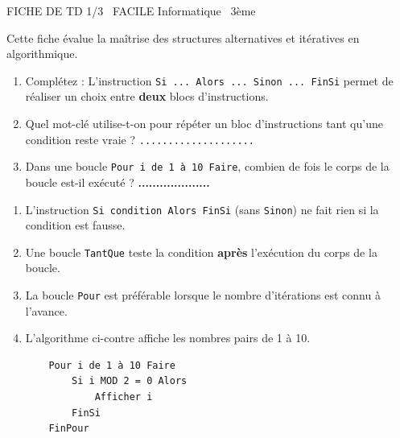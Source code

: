 \documentclass[11pt]{article}
\begin{document}
\begin{tcolorbox}[enhanced,colback=popink,colframe=popink,arc=10pt,boxrule=0pt,left=12pt,right=12pt,top=9pt,bottom=9pt]
{\color{white}\popxbold\small FICHE DE TD 1/3 \textbullet\ FACILE \hfill Informatique \textbullet\ 3ème\par}
\end{tcolorbox}
\vspace{4pt}
Cette fiche évalue la maîtrise des structures alternatives et itératives en algorithmique.

\begin{exercice}
\begin{enumerate}
    \item Complétez : L'instruction \texttt{Si ... Alors ... Sinon ... FinSi} permet de réaliser un choix entre \textbf{deux} blocs d'instructions.
    \item Quel mot-clé utilise-t-on pour répéter un bloc d'instructions tant qu'une condition reste vraie ? \hfill \texttt{....................}
    \item Dans une boucle \texttt{Pour i de 1 à 10 Faire}, combien de fois le corps de la boucle est-il exécuté ? \hfill \textbf{....................}
\end{enumerate}
\end{exercice}

\begin{exercice}
\begin{enumerate}
    \item L'instruction \texttt{Si condition Alors FinSi} (sans \texttt{Sinon}) ne fait rien si la condition est fausse.
    \item Une boucle \texttt{TantQue} teste la condition \textbf{après} l'exécution du corps de la boucle.
    \item La boucle \texttt{Pour} est préférable lorsque le nombre d'itérations est connu à l'avance.
    \item L'algorithme ci-contre affiche les nombres pairs de 1 à 10.
    \begin{verbatim}
    Pour i de 1 à 10 Faire
        Si i MOD 2 = 0 Alors
            Afficher i
        FinSi
    FinPour
    \end{verbatim}
\end{enumerate}
\end{exercice}
\end{document}
